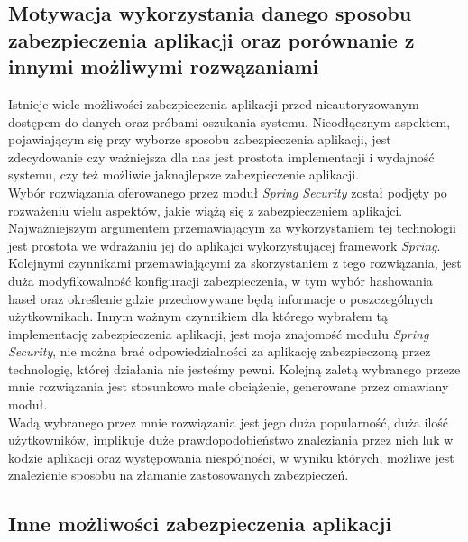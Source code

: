\documentclass[a4paper, titlepage]{article}
\begin{document}
				\subsection{Motywacja wykorzystania danego sposobu zabezpieczenia aplikacji oraz porównanie z innymi możliwymi rozwązaniami}
		Istnieje wiele możliwości zabezpieczenia aplikacji przed nieautoryzowanym dostępem do danych oraz próbami oszukania systemu. Nieodłącznym aspektem, pojawiającym się przy wyborze sposobu zabezpieczenia aplikacji, jest zdecydowanie czy ważniejsza dla nas jest prostota implementacji i wydajność systemu, czy też możliwie jaknajlepsze zabezpieczenie aplikacji.
		\\Wybór rozwiązania oferowanego przez moduł \textit{Spring Security} został podjęty po rozważeniu wielu aspektów, jakie wiążą się z zabezpieczeniem aplikajci. Najważniejszym argumentem przemawiającym za wykorzystaniem tej technologii jest prostota we wdrażaniu jej do aplikajci wykorzystującej framework \textit{Spring}. Kolejnymi czynnikami przemawiającymi za skorzystaniem z tego rozwiązania, jest duża modyfikowalność konfiguracji zabezpieczenia, w tym wybór hashowania haseł oraz określenie gdzie przechowywane będą informacje o poszczególnych użytkownikach. Innym ważnym czynnikiem dla którego wybrałem tą implementację zabezpieczenia aplikacji, jest moja znajomość modułu \textit{Spring Security}, nie można brać odpowiedzialności za aplikację zabezpieczoną przez technologię, której działania nie jesteśmy pewni. Kolejną zaletą wybranego przeze mnie rozwiązania jest stosunkowo małe obciążenie, generowane przez omawiany moduł. 
		\\Wadą wybranego przez mnie rozwiązania jest jego duża popularność, duża ilość użytkowników, implikuje duże prawdopodobieństwo znaleziania przez nich luk w kodzie aplikacji oraz występowania niespójności, w wyniku których, możliwe jest znalezienie sposobu na złamanie zastosowanych zabezpieczeń. 
				\subsection{Inne możliwości zabezpieczenia aplikacji}
\end{document}
